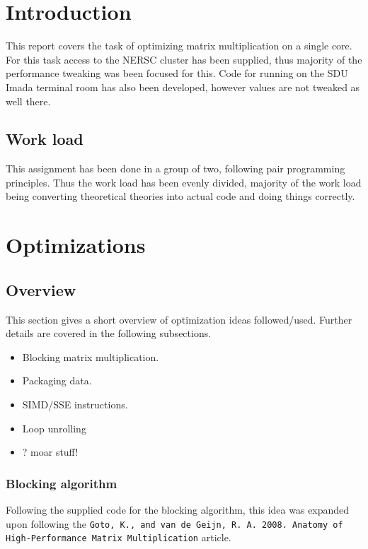 \documentclass[a4paper,11pt,oneside]{book}
\begin{document}
\renewcommand{\contentsname}{Table of Contents}
\tableofcontents
\thispagestyle{empty}

\pagestyle{ruled}
\chapter{Introduction}
\setcounter{section}{1}
This report covers the task of optimizing matrix multiplication on a single core. For this task access to the NERSC cluster has been supplied, thus majority of the performance tweaking was been focused for this. Code for running on the SDU Imada terminal room has also been developed, however values are not tweaked as well there.

\section{Work load}
This assignment has been done in a group of two, following pair programming principles. Thus the work load has been evenly divided, majority of the work load being converting theoretical theories into actual code and doing things correctly.


\chapter{Optimizations}
\section{Overview}
This section gives a short overview of optimization ideas followed/used. Further details are covered in the following subsections.

\begin{itemize}
\item Blocking matrix multiplication.
\item Packaging data.
\item SIMD/SSE instructions.
\item Loop unrolling
\item ? moar stuff! %
\end{itemize}

\subsection{Blocking algorithm}
Following the supplied code for the blocking algorithm, this idea was expanded upon following the \verb!Goto, K., and van de Geijn, R. A. 2008. Anatomy of High-Performance Matrix Multiplication! article.
\end{document}
